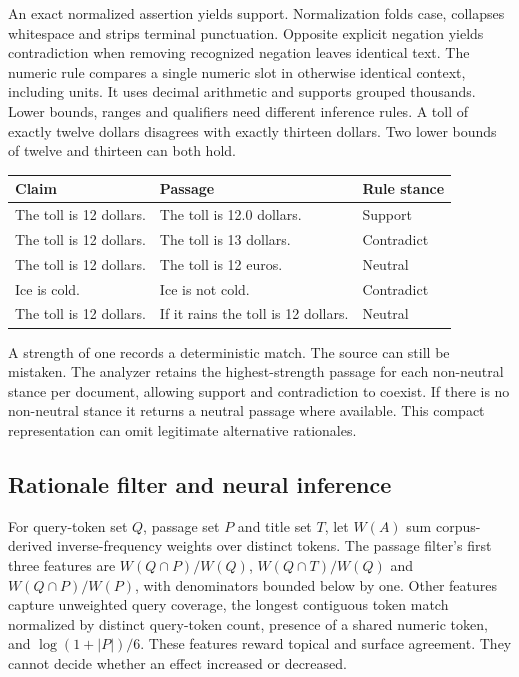 An exact normalized assertion yields support. Normalization folds case, collapses whitespace and strips terminal punctuation. Opposite explicit negation yields contradiction when removing recognized negation leaves identical text. The numeric rule compares a single numeric slot in otherwise identical context, including units. It uses decimal arithmetic and supports grouped thousands. Lower bounds, ranges and qualifiers need different inference rules. A toll of exactly twelve dollars disagrees with exactly thirteen dollars. Two lower bounds of twelve and thirteen can both hold.

\begin{center}\small
\begin{tabularx}{\linewidth}{@{}p{.32\linewidth}Xl@{}}\toprule
Claim & Passage & Rule stance\\\midrule
The toll is 12 dollars. & The toll is 12.0 dollars. & Support\\
The toll is 12 dollars. & The toll is 13 dollars. & Contradict\\
The toll is 12 dollars. & The toll is 12 euros. & Neutral\\
Ice is cold. & Ice is not cold. & Contradict\\
The toll is 12 dollars. & If it rains the toll is 12 dollars. & Neutral\\\bottomrule
\end{tabularx}
\end{center}
A strength of one records a deterministic match. The source can still be mistaken. The analyzer retains the highest-strength passage for each non-neutral stance per document, allowing support and contradiction to coexist. If there is no non-neutral stance it returns a neutral passage where available. This compact representation can omit legitimate alternative rationales.

\subsection{Rationale filter and neural inference}
For query-token set $Q$, passage set $P$ and title set $T$, let $W(A)$ sum corpus-derived inverse-frequency weights over distinct tokens. The passage filter's first three features are $W(Q\cap P)/W(Q)$, $W(Q\cap T)/W(Q)$ and $W(Q\cap P)/W(P)$, with denominators bounded below by one. Other features capture unweighted query coverage, the longest contiguous token match normalized by distinct query-token count, presence of a shared numeric token, and $\log(1+|P|)/6$. These features reward topical and surface agreement. They cannot decide whether an effect increased or decreased.


